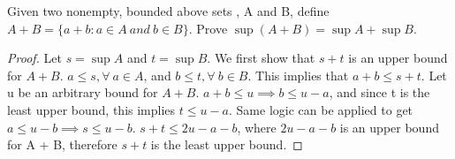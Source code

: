 \documentclass{article}
\begin{document}
\begin{example}
    Given two nonempty, bounded above sets , A and B, define $A + B = \{a + b : a \in A\ and\ b\in B\}$. Prove $\operatorname{sup}(A+B) = \operatorname{sup}A + \operatorname{sup}B$.
\end{example}
\begin{proof}
    Let $s = \operatorname{sup}A$ and $t = \operatorname{sup}B$. We first show that $s + t$ is an upper bound for $A + B$. $a \leq s, \forall\ a \in A$, and $b \leq t, \forall\ b \in B$. This implies that $a + b \leq s + t$. Let u be an arbitrary bound for $A+B$. $a + b \leq u\implies b \leq u-a$, and since t is the least upper bound, this implies $t \leq u -a$. Same logic can be applied to get $a \leq u - b \implies s \leq u- b$. $s + t \leq 2u - a - b$, where $2u - a -b$ is an upper bound for A + B, therefore $s + t$ is the least upper bound.
\end{proof}
\end{document}
